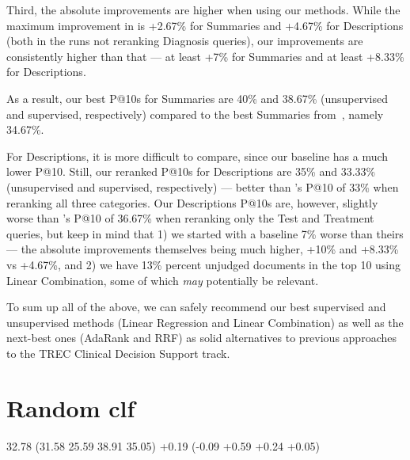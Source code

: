 Third, the absolute improvements are higher when using our methods.
While the maximum improvement
in \cite{choi} is +2.67\% for Summaries and +4.67\% for Descriptions (both in the runs not reranking Diagnosis queries),
our improvements are consistently
higher than that --- at least +7\% for Summaries and at least +8.33\% for Descriptions.

As a result, our best P@10s for Summaries are 40\% and 38.67\%
(unsupervised and supervised, respectively) compared to the best Summaries from~\cite{choi}, namely 34.67\%.

For Descriptions, it is more difficult to compare, since our baseline has a much lower P@10.
Still, our reranked P@10s for Descriptions are 35\% and 33.33\% (unsupervised and supervised, respectively)
 --- better than \cite{choi}'s P@10 of 33\% when reranking all three categories.
Our Descriptions P@10s are, however, slightly worse
than \cite{choi}'s P@10 of 36.67\% when reranking only the Test and Treatment queries, but keep in mind that
1) we started with a baseline 7\% worse than theirs --- the absolute improvements themselves being much higher, +10\% and +8.33\%
vs +4.67\%, and 2) we have 13\% percent unjudged documents in the top 10 using Linear Combination,
some of which \emph{may} potentially be relevant.

To sum up all of the above, we can safely recommend our best supervised and unsupervised methods
(Linear Regression and Linear Combination) as well as the next-best ones (AdaRank and RRF)
as solid alternatives to previous approaches to the TREC Clinical Decision Support track.

\section{Random clf}
32.78 (31.58 25.59 38.91 35.05)
+0.19 (-0.09 +0.59 +0.24 +0.05)

%








